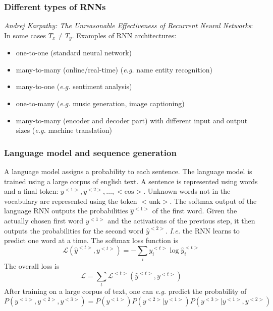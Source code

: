 \documentclass{article}
\begin{document}
\subsubsection{Different types of RNNs}
\emph{Andrej Karpathy: The Unreasonable Effectiveness of Recurrent Neural Networks}:
In some cases $T_x\neq T_y$.
Examples of RNN architectures:
\begin{itemize}
  \item one-to-one (standard neural network)
  \item many-to-many (online/real-time) (\emph{e.g.} name entity recognition)
  \item many-to-one (\emph{e.g.} sentiment analysis)
  \item one-to-many (\emph{e.g.} music generation, image captioning)
  \item many-to-many (encoder and decoder part) with different input and output sizes (\emph{e.g.} machine translation)
\end{itemize}

\subsubsection{Language model and sequence generation}\label{cha:langmod}
A language model assigns a probability to each sentence.
The language model is trained using a large corpus of english text.
A sentence is represented using words and a final token: $y^{<1>}, y^{<2>},\ldots,\mathrm{<eos>}$.
Unknown words not in the vocabulary are represented using the token $\mathrm{<unk>}$.
The softmax output of the language RNN outputs the probabilities $\hat{y}^{<1>}$ of the first word.
Given the actually chosen first word $y^{<1>}$ and the activations of the previous step,
it then outputs the probabilities for the second word $\hat{y}^{<2>}$.
\emph{I.e.} the RNN learns to predict one word at a time.
The softmax loss function is
\begin{equation}
  \mathcal{L}(\hat{y}^{<t>},y^{<t>})=-\sum_i y^{<t>}_i \log \hat{y}^{<t>}_i
\end{equation}
The overall loss is
\begin{equation}
  \mathcal{L}=\sum_t\mathcal{L}^{<t>}(\hat{y}^{<t>},y^{<t>})
\end{equation}
After training on a large corpus of text,
one can \emph{e.g.} predict the probability of
\begin{equation}
  P(y^{<1>},y^{<2>},y^{<3>})=P(y^{<1>})P(y^{<2>}|y^{<1>})P(y^{<3>}|y^{<1>},y^{<2>})
\end{equation}
\end{document}
